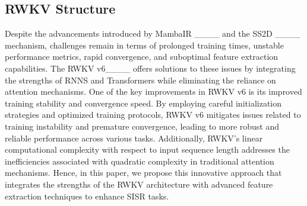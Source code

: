 
\subsection{RWKV Structure}

Despite the advancements introduced by MambaIR ____ and the SS2D ____ mechanism, challenges remain in terms of prolonged training times, unstable performance metrics, rapid convergence, and suboptimal feature extraction capabilities. The RWKV v6____ offers solutions to these issues by integrating the strengths of RNNS and Transformers while eliminating the reliance on attention mechanisms. One of the key improvements in RWKV v6 is its improved training stability and convergence speed. By employing careful initialization strategies and optimized training protocols, RWKV v6 mitigates issues related to training instability and premature convergence, leading to more robust and reliable performance across various tasks. Additionally, RWKV's linear computational complexity with respect to input sequence length addresses the inefficiencies associated with quadratic complexity in traditional attention mechanisms. Hence, in this paper, we propose this innovative approach that integrates the strengths of the RWKV architecture with advanced feature extraction techniques to enhance SISR tasks.